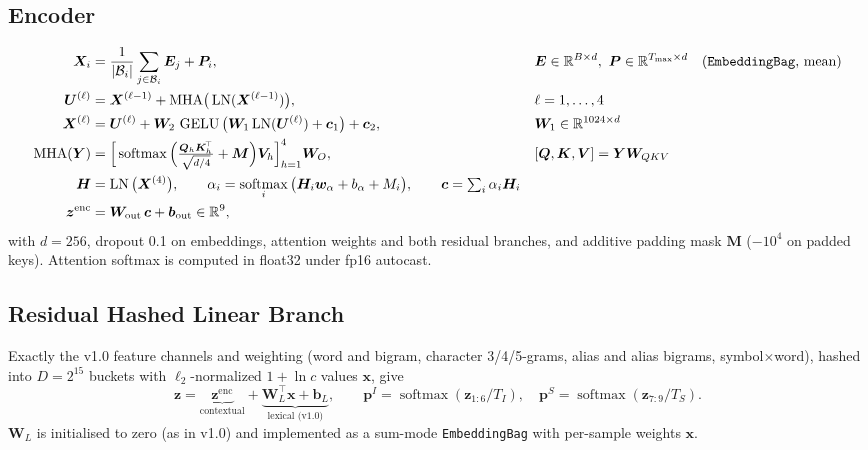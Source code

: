 \documentclass[11pt,a4paper]{article}
\theoremstyle{remark}
\newcommand{\R}{\mathbb{R}}
\newcommand{\x}{\bm{x}}
\newcommand{\W}{\bm{W}}
\newcommand{\bb}{\bm{b}}
\newcommand{\z}{\bm{z}}
\newcommand{\p}{\bm{p}}
\DeclareMathOperator{\softmax}{softmax}
\DeclareMathOperator{\LN}{LN}
\DeclareMathOperator{\GELU}{GELU}
\begin{document}
\subsection{Encoder}
\begin{align}
  \bm X_i &= \frac{1}{|\mathcal{B}_i|}\sum_{j\in\mathcal{B}_i}\bm E_j + \bm P_i, && \bm E\in\R^{B\times d},\ \bm P\in\R^{T_{\max}\times d}\quad\text{(\texttt{EmbeddingBag}, mean)} \label{eq:embed}\\
  \bm U^{(\ell)} &= \bm X^{(\ell-1)} + \mathrm{MHA}\big(\LN(\bm X^{(\ell-1)})\big), && \ell = 1,\dots,4 \\
  \bm X^{(\ell)} &= \bm U^{(\ell)} + \bm W_2\,\GELU\big(\bm W_1 \LN(\bm U^{(\ell)}) + \bm c_1\big) + \bm c_2, && \bm W_1\in\R^{1024\times d}\\
  \mathrm{MHA}(\bm Y) &= \Big[\softmax\Big(\tfrac{\bm Q_h\bm K_h^{\!\top}}{\sqrt{d/4}} + \bm M\Big)\bm V_h\Big]_{h=1}^{4}\bm W_O, && [\bm Q,\bm K,\bm V] = \bm Y\bm W_{QKV}\\
  \bm H &= \LN\big(\bm X^{(4)}\big),\qquad \alpha_i = \softmax_i\big(\bm H_i\bm w_\alpha + b_\alpha + M_i\big),\qquad \bm c = \textstyle\sum_i\alpha_i\bm H_i \\
  \z^{\text{enc}} &= \bm W_{\text{out}}\,\bm c + \bm b_{\text{out}} \in\R^{9},
\end{align}
with $d=256$, dropout 0.1 on embeddings, attention weights and both residual branches, and additive padding mask $\bm M$ ($-10^4$ on padded keys). Attention softmax is computed in float32 under fp16 autocast.

\subsection{Residual Hashed Linear Branch}
Exactly the v1.0 feature channels and weighting (word and bigram, character 3/4/5-grams, alias and alias bigrams, symbol$\times$word), hashed into $D=2^{15}$ buckets with $\ell_2$-normalized $1+\ln c$ values $\x$, give
\begin{equation}
  \z = \underbrace{\z^{\text{enc}}}_{\text{contextual}} + \underbrace{\W_L^{\!\top}\x + \bb_L}_{\text{lexical (v1.0)}},\qquad
  \p^{I}=\softmax(\z_{1:6}/T_I),\quad \p^{S}=\softmax(\z_{7:9}/T_S).
\end{equation}
$\W_L$ is initialised to zero (as in v1.0) and implemented as a sum-mode \texttt{EmbeddingBag} with per-sample weights $\x$.
\end{document}
